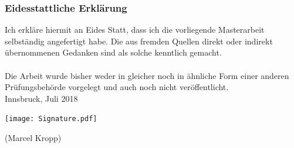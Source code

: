 \documentclass[a4paper,12pt,oneside,pointednumbers,bibtotoc,bigheadings,liststotoc]{scrbook}
\renewcommand*{\paragraph}[1]{\subsubsection*{#1} \vspace{-3mm}} %
\begin{document}
\paragraph{\large{Eidesstattliche Erklärung}}
\vspace{43pt}
Ich erkläre hiermit an Eides Statt, dass ich die vorliegende Masterarbeit selbständig angefertigt habe. Die aus fremden Quellen direkt oder indirekt übernommenen Gedanken sind als solche kenntlich gemacht.\\
\\
Die Arbeit wurde bisher weder in gleicher noch in ähnliche Form einer anderen Prüfungsbehörde vorgelegt und auch noch nicht veröffentlicht.\\[10mm]
Innsbruck, Juli 2018
\begin{flushright}[htb]
     \texttt{[image: Signature.pdf]}
\end{flushright}
\hspace*{256pt}
(Marcel Kropp)


\end{document}
